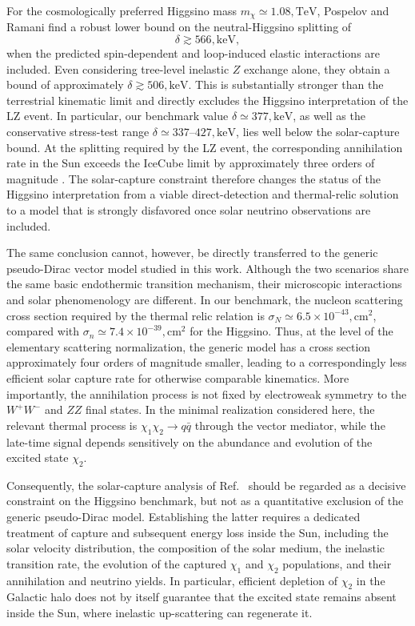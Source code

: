 \documentclass[aps,prd,reprint,superscriptaddress,nofootinbib,longbibliography,floatfix]{revtex4-2}
\newcommand{\TeV}{\mathrm{TeV}}
\newcommand{\keV}{\mathrm{keV}}
\begin{document}
For the cosmologically preferred Higgsino mass $m_\chi\simeq1.08,\TeV$, Pospelov and Ramani find a robust lower bound on the neutral-Higgsino splitting of
\begin{equation}
\delta \gtrsim 566,\keV,
\end{equation}
when the predicted spin-dependent and loop-induced elastic interactions are included. Even considering tree-level inelastic $Z$ exchange alone, they obtain a bound of approximately $\delta\gtrsim506,\keV$. This is substantially stronger than the terrestrial kinematic limit and directly excludes the Higgsino interpretation of the LZ event. In particular, our benchmark value $\delta\simeq377,\keV$, as well as the conservative stress-test range $\delta\simeq337$--$427,\keV$, lies well below the solar-capture bound. At the splitting required by the LZ event, the corresponding annihilation rate in the Sun exceeds the IceCube limit by approximately three orders of magnitude \cite{PospelovRamani2026}. The solar-capture constraint therefore changes the status of the Higgsino interpretation from a viable direct-detection and thermal-relic solution to a model that is strongly disfavored once solar neutrino observations are included.

The same conclusion cannot, however, be directly transferred to the generic pseudo-Dirac vector model studied in this work. Although the two scenarios share the same basic endothermic transition mechanism, their microscopic interactions and solar phenomenology are different. In our benchmark, the nucleon scattering cross section required by the thermal relic relation is $\sigma_N\simeq6.5\times10^{-43},\mathrm{cm}^2$, compared with $\sigma_n\simeq7.4\times10^{-39},\mathrm{cm}^2$ for the Higgsino. Thus, at the level of the elementary scattering normalization, the generic model has a cross section approximately four orders of magnitude smaller, leading to a correspondingly less efficient solar capture rate for otherwise comparable kinematics. More importantly, the annihilation process is not fixed by electroweak symmetry to the $W^+W^-$ and $ZZ$ final states. In the minimal realization considered here, the relevant thermal process is $\chi_1\chi_2\rightarrow q\bar q$ through the vector mediator, while the late-time signal depends sensitively on the abundance and evolution of the excited state $\chi_2$.

Consequently, the solar-capture analysis of Ref.~\cite{PospelovRamani2026} should be regarded as a decisive constraint on the Higgsino benchmark, but not as a quantitative exclusion of the generic pseudo-Dirac model. Establishing the latter requires a dedicated treatment of capture and subsequent energy loss inside the Sun, including the solar velocity distribution, the composition of the solar medium, the inelastic transition rate, the evolution of the captured $\chi_1$ and $\chi_2$ populations, and their annihilation and neutrino yields. In particular, efficient depletion of $\chi_2$ in the Galactic halo does not by itself guarantee that the excited state remains absent inside the Sun, where inelastic up-scattering can regenerate it.
\end{document}
